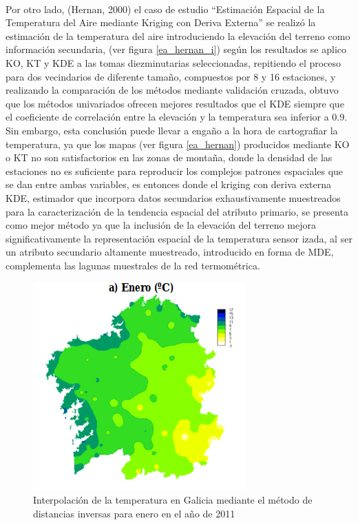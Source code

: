 \\
Por otro lado, (Hernan, 2000) \cite{hernan_ea} el caso de estudio ``Estimación Espacial de la Temperatura del Aire mediante Kriging con Deriva Externa''  se realizó la estimación  de  la  temperatura  del  aire  introduciendo  la  elevación del  terreno  como  información  secundaria, (ver figura \ref{ea_hernan_i}) según los resultados se aplico KO, KT y KDE a las tomas diezminutarias seleccionadas, repitiendo el proceso para  dos  vecindarios  de  diferente  tamaño,  compuestos  por  8  y  16  estaciones, y realizando la comparación de los métodos mediante  validación  cruzada, obtuvo que  los  métodos  univariados  ofrecen mejores  resultados  que  el  KDE  siempre  que  el  coeficiente  de  correlación  entre  la  elevación  y  la temperatura sea inferior a 0.9.  Sin  embargo,  esta conclusión puede  llevar  a  engaño  a  la  hora  de  cartografiar  la temperatura, ya que los mapas (ver figura \ref{ea_hernan}) producidos mediante KO o KT no son satisfactorios en las zonas de montaña, donde la densidad de las estaciones no es suficiente para reproducir los complejos patrones espaciales que se dan entre ambas variables, es entonces donde  el kriging  con  deriva  externa  KDE, estimador  que  incorpora  datos secundarios exhaustivamente muestreados para la caracterización de la tendencia espacial del atributo primario, se presenta como mejor método ya que la  inclusión  de  la  elevación  del  terreno  mejora  significativamente  la  representación  espacial de  la  temperatura  sensor izada, al  ser  un  atributo  secundario  altamente muestreado,   introducido   en   forma   de   MDE,   complementa   las   lagunas   muestrales   de   la   red termométrica.


\begin{figure}
    \centering
    \includegraphics[scale=0.6]{proyectos/proyecto_geoestadistica_croacia/images/ea_galicia_di.png}
    \caption{Interpolación de la temperatura en Galicia mediante el método de distancias inversas para enero en el año de 2011}
    \label{ea_galicia_di}
\end{figure}


